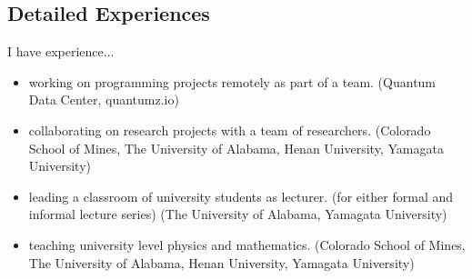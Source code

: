 \subsection{Detailed Experiences}

I have experience...
%
\begin{itemize}
  \item working on programming projects remotely as part of a team. (Quantum Data Center, quantumz.io)
  \item collaborating on research projects with a team of researchers. (Colorado School of Mines, The University of Alabama, Henan University, Yamagata University)
  \item leading a classroom of university students as lecturer. (for either formal and informal lecture series) (The University of Alabama, Yamagata University)
  \item teaching university level physics and mathematics. (Colorado School of Mines, The University of Alabama, Henan University, Yamagata University)
\end{itemize}
